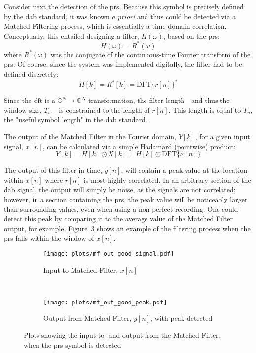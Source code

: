 \documentclass[class=report,11pt,crop=false]{standalone}
\begin{document}
Consider next the detection of the \gls{prs}. Because this symbol is precisely defined by the \gls{dab} standard, it was known \emph{a priori} and thus could be detected via a Matched Filtering process, which is essentially a time-domain correlation. Conceptually, this entailed designing a filter, \(H(\omega)\), based on the \gls{prs}:
\begin{equation}
  H(\omega) = R^*(\omega)
\end{equation}
where \(R^*(\omega)\) was the conjugate of the continuous-time Fourier transform of the \gls{prs}. Of course, since the system was implemented digitally, the filter had to be defined discretely:
\begin{equation}
  H[k] = R^*[k] = \mathrm{DFT} \{ r[n] \}^*
\end{equation}

Since the \gls{dft} is a \(\mathbb{C}^N \rightarrow \mathbb{C}^N\) transformation, the filter length---and thus the window size, \(T_w\)---is constrained to the length of \(r[n]\). This length is equal to \(T_u\), the "useful symbol length" in the \gls{dab} standard.

The output of the Matched Filter in the Fourier domain, \(Y[k]\), for a given input signal, \(x[n]\), can be calculated via a simple Hadamard (pointwise) product:
\begin{equation}
  Y[k] = H[k] \odot X[k] = H[k] \odot \mathrm{DFT} \{ x[n] \}
\end{equation}

The output of this filter in time, \(y[n]\), will contain a peak value at the location within \(x[n]\) where \(r[n]\) is most highly correlated. In an arbitrary section of the \gls{dab} signal, the output will simply be noise, as the signals are not correlated; however, in a section containing the \gls{prs}, the peak value will be noticeably larger than surrounding values, even when using a non-perfect recording. One could detect this peak by comparing it to the average value of the Matched Filter output, for example. Figure~\ref{fig:mf_out_good} shows an example of the filtering process when the \gls{prs} falls within the window of \(x[n]\).

\begin{figure}[htbp]
  \centering
  \captionsetup{type=figure}
  \begin{subfigure}[t]{\textwidth}
    \centering
    \captionsetup{type=figure}
    \texttt{[image: plots/mf\_out\_good\_signal.pdf]}
    \caption{Input to Matched Filter, \(x[n]\)}
    \label{fig:mf_out_good_signal}
  \end{subfigure}%
  \\
  \begin{subfigure}[t]{\textwidth}
    \centering
    \captionsetup{type=figure}
    \texttt{[image: plots/mf\_out\_good\_peak.pdf]}
    \caption{Output from Matched Filter, \(y[n]\), with peak detected}
    \label{fig:mf_out_good_peak}
  \end{subfigure}
  \caption{Plots showing the input to- and output from the Matched Filter, when the \gls{prs} symbol is detected}
  \label{fig:mf_out_good}
\end{figure}
\end{document}
